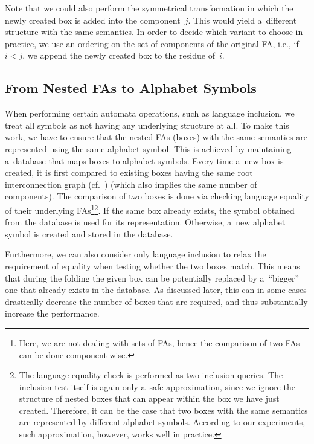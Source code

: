 {Note that we could also perform the symmetrical transformation in which the newly created
box is added into the component~$j$. This would yield a~different structure with the same
semantics. In order to decide which variant to choose in practice, we use an ordering on
the set of components of the original FA, i.e., if $i < j$, we append the newly created
box to the residue of~$i$.

\subsection{From Nested FAs to Alphabet Symbols}

When performing certain automata operations,
such as language inclusion, we treat all symbols as not having any underlying
structure at all.
To make this work, we have to ensure that the nested FAs (boxes) with the same
semantics are represented using the same alphabet symbol.
This is achieved by maintaining
a~database that maps boxes to alphabet symbols. Every time a~new box is created, it is
first compared to existing boxes having the same root interconnection graph (cf.\ ) (which also
implies the same number of components).
The comparison of two boxes is done via checking
language equality of their underlying FAs\footnote{
Here, we are not dealing with sets of FAs, hence the comparison of two FAs can
be done component-wise.
}\footnote{The language equality check is performed as two inclusion queries.
The inclusion test itself is again only a~safe approximation, since we ignore the structure
of nested boxes that can appear within the box we have just created. Therefore,
it can be the case that two boxes with the same semantics are represented by different
alphabet symbols. According to our experiments, such approximation, however,
works well in practice.
}.
If the same box already exists, the symbol obtained from the database is used for its
representation. Otherwise, a~new alphabet symbol is created and
stored in the database.

Furthermore, we can also consider only language inclusion to relax the requirement of
equality when testing whether the two boxes match. This means that during the folding the
given box can be potentially replaced by a~``bigger'' one that already exists in the
database. As discussed later, this can in some cases drastically decrease the number of
boxes that are required, and thus substantially increase the performance.

}
